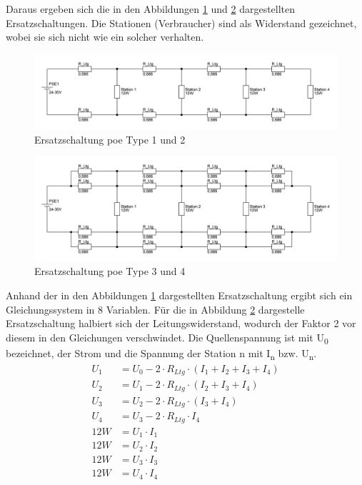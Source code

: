 Daraus ergeben sich die in den Abbildungen \ref{fig:ers-type12} und \ref{fig:ers-type34} dargestellten Ersatzschaltungen.
Die Stationen (Verbraucher) sind als Widerstand gezeichnet, wobei sie sich nicht wie ein solcher verhalten.
\begin{figure}[htbp!]
	\centering
	\includegraphics[width=\linewidth]{images/berechnung/poe2pair.png}
	\caption{Ersatzschaltung  \ac{poe} Type 1 und 2}
	\label{fig:ers-type12}
\end{figure}
\begin{figure}[htbp!]
	\centering
	\includegraphics[width=\linewidth]{images/berechnung/poe4pair_neu.jpg}
	\caption{Ersatzschaltung  \ac{poe} Type 3 und 4}
	\label{fig:ers-type34}
\end{figure}

Anhand der in den Abbildungen \ref{fig:ers-type12} dargestellten Ersatzschaltung ergibt sich ein Gleichungssystem in 8 Variablen.
Für die in Abbildung \ref{fig:ers-type34} dargestelle Ersatzschaltung halbiert sich der Leitungswiderstand, wodurch der Faktor 2 vor diesem in den Gleichungen verschwindet.
Die Quellenspannung ist mit U\textsubscript{0} bezeichnet, der Strom und die Spannung der Station n mit I\textsubscript{n} bzw. U\textsubscript{n}.
\begin{align}
	U_1 &= U_0-2\cdot R_{Ltg}\cdot (I_1+I_2+I_3+I_4)\\
	U_2 &= U_1-2\cdot R_{Ltg}\cdot (I_2+I_3+I_4)\\
	U_3 &= U_2-2\cdot R_{Ltg}\cdot (I_3+I_4)\\
	U_4 &= U_3-2\cdot R_{Ltg}\cdot I_4\\
	12W &= U_1\cdot I_1\\
	12W &= U_2\cdot I_2\\
	12W &= U_3\cdot I_3\\
	12W &= U_4\cdot I_4
\end{align}

